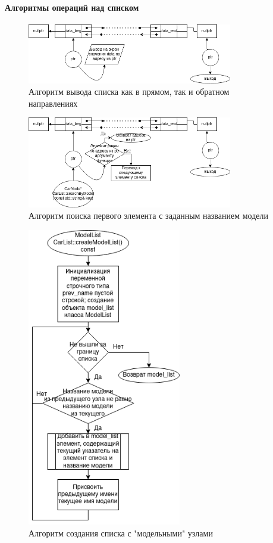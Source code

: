 \documentclass[a4paper, 14pt]{extarticle}
\begin{document}
\paragraph{Алгоритмы операций над списком}
\begin{figure}[htpb]
  \centering
  \includegraphics[width=0.8\textwidth]{pictures/print_list.png}
  \caption{Алгоритм вывода списка как в прямом, так и обратном направлениях}
  \label{fig:print_list}
\end{figure}
\begin{figure}[htpb]
  \centering
  \includegraphics[width=0.8\textwidth]{pictures/search_model_ok.png}
  \caption{Алгоритм поиска первого элемента с заданным названием модели}
  \label{fig:search_model}
\end{figure}
\begin{figure}[htpb]
  \centering
  \includegraphics[width=0.6\textwidth]{pictures/createList.png}
  \caption{Алгоритм создания списка с "модельными" узлами}
  \label{fig:create_list}
\end{figure}
\end{document}
